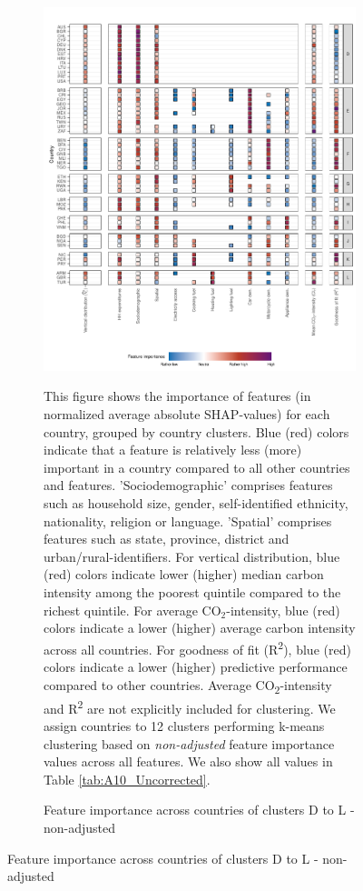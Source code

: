 \clearpage
\begin{figure}[ht!]\ContinuedFloat
    \centering
    \begin{subfigure}[b]{\textwidth}
    \centering
    \caption{Feature importance across countries of clusters D to L - non-adjusted}\label{fig:fig_4_2_uncorrected}
    \includegraphics{Figure 4/Figure_4_Uncorrected_2.pdf}
    \begin{subcaption2}
    This figure shows the importance of features (in normalized average absolute SHAP-values) for each country, grouped by country clusters. Blue (red) colors indicate that a feature is relatively less (more) important in a country compared to all other countries and features. 'Sociodemographic' comprises features such as household size, gender, self-identified ethnicity, nationality, religion or language. 'Spatial' comprises features such as state, province, district and urban/rural-identifiers. For vertical distribution, blue (red) colors indicate lower (higher) median carbon intensity among the poorest quintile compared to the richest quintile. For average CO$_{2}$-intensity, blue (red) colors indicate a lower (higher) average carbon intensity across all countries. For goodness of fit (R\textsuperscript{2}), blue (red) colors indicate a lower (higher) predictive performance compared to other countries. Average CO\textsubscript{2}-intensity and R\textsuperscript{2} are not explicitly included for clustering.
    We assign countries to 12 clusters performing k-means clustering based on \textit{non-adjusted} feature importance values across all features. We also show all values in Table \ref{tab:A10_Uncorrected}.
    \end{subcaption2}
    \end{subfigure}
    
\end{figure}
\clearpage

